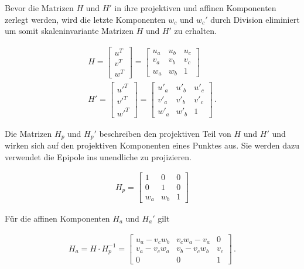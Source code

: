 Bevor die Matrizen $H$ und $H'$ in ihre projektiven und affinen Komponenten zerlegt werden, wird die letzte Komponenten $w_c$ und $w_c'$ durch Division eliminiert um somit skaleninvariante Matrizen $H$ und $H'$ zu erhalten\cite{ZZ,phdextrinsicPara}. 
%

\begin{gather}
	H = \begin{bmatrix}
		u^T\\v^T\\w^T
	\end{bmatrix} =
	\begin{bmatrix}
		u_a&u_b&u_c\\
		v_a&v_b&v_c\\
		w_a&w_b&1
	\end{bmatrix}\\
	H' = \begin{bmatrix}
		u'^T\\v'^T\\w'^T
	\end{bmatrix} =
	\begin{bmatrix}
		u'_a&u'_b&u'_c\\
		v'_a&v'_b&v'_c\\
		w'_a&w'_b&1
	\end{bmatrix}	\,.
\end{gather}


Die Matrizen $H_p$ und $H_p'$ beschreiben den projektiven Teil von $H$ und $H'$ und wirken sich auf den projektiven Komponenten eines Punktes aus. Sie werden dazu verwendet die Epipole ins unendliche zu projizieren\cite{ZZ,phdextrinsicPara}.


\begin{gather}
	H_p = 
	\begin{bmatrix}
		1&0&0\\
		0&1&0\\
		w_a&w_b&1
	\end{bmatrix}
\end{gather}

Für die affinen Komponenten $H_a$ und $H_a'$ gilt

\begin{gather}
	H_a= H \cdot H^{-1}_p = 
	\begin{bmatrix}
		u_a-v_cw_b&v_cw_a-v_a&0\\
		v_a-v_cw_a&v_b-v_cw_b&v_c\\
		0&0&1
	\end{bmatrix} \, .
\end{gather}



